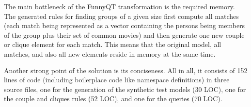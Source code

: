 \documentclass[submission]{eptcs}
\begin{document}
The main bottleneck of the FunnyQT transformation is the required memory.  The
generated rules for finding groups of a given size first compute all matches
(each match being represented as a vector containing the persons being members
of the group plus their set of common movies) and then generate one new couple
or clique element for each match.  This means that the original model, all
matches, and also all new elements reside in memory at the same time.

Another strong point of the solution is its conciseness.  All in all, it
consists of 152 lines of code (including boilerplace code like namespace
definitions) in three source files, one for the generation of the synthetic
test models (30 LOC), one for the couple and cliques rules (52 LOC), and one
for the queries (70 LOC).




\end{document}
